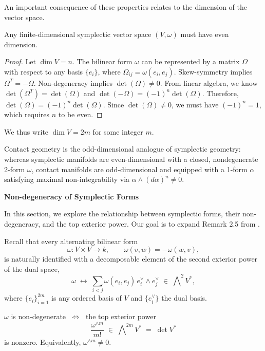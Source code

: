 An important consequence of these properties relates to the dimension of the vector space.
\begin{proposition} \label{prop:symplectic_dim}
Any finite-dimensional symplectic vector space $(V, \omega)$ must have even dimension.
\end{proposition}
\begin{proof}
Let $\dim V = n$. The bilinear form $\omega$ can be represented by a matrix $\Omega$ with respect to any basis $\{e_i\}$, where $\Omega_{ij} = \omega(e_i, e_j)$. Skew-symmetry implies $\Omega^T = -\Omega$. Non-degeneracy implies $\det(\Omega) \neq 0$. From linear algebra, we know $\det(\Omega^T) = \det(\Omega)$ and $\det(-\Omega) = (-1)^n \det(\Omega)$. Therefore, $\det(\Omega) = (-1)^n \det(\Omega)$. Since $\det(\Omega) \neq 0$, we must have $(-1)^n = 1$, which requires $n$ to be even.
\end{proof}
We thus write $\dim V = 2m$ for some integer $m$.

\begin{remark}
    Contact geometry is the odd-dimensional analogue of symplectic geometry: whereas symplectic manifolds are even-dimensional with a closed, nondegenerate 2-form $\omega$, contact manifolds are odd-dimensional and equipped with a 1-form $\alpha$ satisfying maximal non-integrability via $\alpha \wedge (d\alpha)^n \neq 0$.
\end{remark}

\textbf{Non-degeneracy of Symplectic Forms} \label{sec:non-degeneracy}

In this section, we explore the relationship between symplectic forms, their non-degeneracy, and the top exterior power. Our goal is to expand Remark 2.5 from \cite{freed}. 

Recall that every alternating bilinear form
\[
\omega \colon V\times V \longrightarrow k,\qquad \omega(v,w)=-\omega(w,v),
\]
is naturally identified with a decomposable element of the second exterior power of the dual space,
\[
\omega \;\longleftrightarrow\; \sum_{i<j}\omega(e_i,e_j)\,e_i^\vee\wedge e_j^\vee\;\in\;\bigwedge\nolimits^2 V^{\!*},
\]
where $\{e_i\}_{i=1}^{2m}$ is any ordered basis of $V$ and $\{e_i^\vee\}$ the dual basis.  

\begin{proposition}
    $\omega$ is non-degenerate $\;\Longleftrightarrow\;$ the top exterior power
\[
\frac{\omega^{\wedge m}}{m!}\;\in\;\bigwedge\nolimits^{2m}V^{\!*}\;=\;\det V^{\!*}
\]
is nonzero.  Equivalently, $\omega^{\wedge m}\neq 0$.
\end{proposition}

